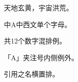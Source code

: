 \documentclass{ltc-cn-vbook}
\begin{document}
\begin{正文}
天地玄黄，宇宙洪荒。

中A中西文单个字母。

共12个数字混排例。

「A」夹注号内侧例外。

引用之名横置排。
\end{正文}
\end{document}
